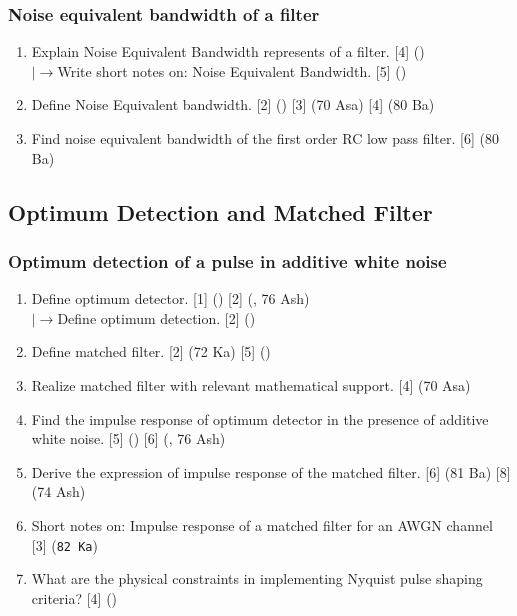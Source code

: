 \documentclass[12pt]{article}
\newcommand{\lb}{\\$\left|\rightarrow\right.$}
\begin{document}
    \subsubsection{Noise equivalent bandwidth of a filter}
    	\begin{enumerate}
    		\item Explain Noise Equivalent Bandwidth represents of a filter. \hfill [4] ()
    		\lb Write short notes on: Noise Equivalent Bandwidth. \hfill [5] ()
    		
    		\item Define Noise Equivalent bandwidth. \hfill [2] () [3] (70 Asa) [4] (80 Ba)
    		
    		\item Find noise equivalent bandwidth of the first order RC low pass filter. \hfill [6] (80 Ba)
    	\end{enumerate}
    
  \subsection{Optimum Detection and Matched Filter}
    \subsubsection{Optimum detection of a pulse in additive white noise}
      \begin{enumerate}
        \item Define optimum detector. \hfill [1] () [2] (, 76 Ash)
        \lb Define optimum detection. \hfill [2] ()
        
        \item Define matched filter. \hfill [2] (72 Ka) [5] ()
        
        \item Realize matched filter with relevant mathematical support. \hfill [4] (70 Asa)

        \item Find the impulse response of optimum detector in the presence of additive white noise. \hfill [5] () [6] (, 76 Ash)
        
        \item Derive the expression of impulse response of the matched filter. \hfill [6] (81 Ba) [8] (74 Ash)

        \item Short notes on: Impulse response of a matched filter for an AWGN channel \hfill [3] (\texttt{82 Ka})
        
        \item What are the physical constraints in implementing Nyquist pulse shaping criteria? \hfill [4] ()
      \end{enumerate}
\end{document}
